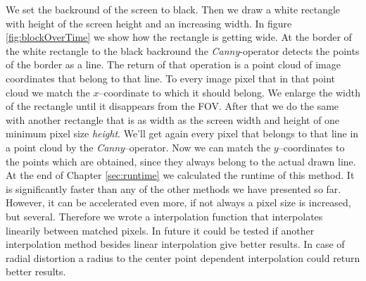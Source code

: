 \documentclass[journal,final,a4paper,twoside]{PS}
\begin{document}
We set the backround of the screen to black. Then we draw a white rectangle with height of the screen height and an increasing width. In figure \ref{fig:blockOverTime} we show how the rectangle is getting wide. At the border of the white rectangle to the black backround the \emph{Canny}-operator detects the points of the border as a line. The return of that operation is a point cloud of image coordinates that belong to that line. To every image pixel that in that point cloud we match the $x$--coordinate to which it should belong. We enlarge the width of the rectangle until it disappears from the FOV. After that we do the same with another rectangle that is as width as the screen width and height of one minimum pixel size \emph{height}. We'll get again every pixel that belongs to that line in a point cloud by the \emph{Canny}--operator. Now we can match the $y$--coordinates to the points which are obtained, since they always belong to the actual drawn line. At the end of Chapter \ref{sec:runtime} we calculated the runtime of this method. It is significantly faster than any of the other methods we have presented so far. However, it can be accelerated even more, if not always a pixel size is increased, but several. Therefore we wrote a interpolation function that interpolates linearily between matched pixels. In future it could be tested if another interpolation method besides linear interpolation give better results. In case of radial distortion a radius to the center point dependent interpolation could return better results.
\\
\end{document}
